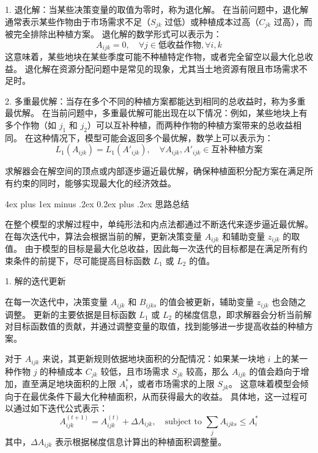 \documentclass[12pt,a4paper]{nmmcm}
\makeatletter
\renewcommand\subsubsection{\@startsection{subsubsection}{3}{1em}%
  {4ex plus 1ex minus .2ex}%
  {0.2ex plus .2ex}%
  {\normalfont\large\bfseries}}
\makeatother
\begin{document}
1. 退化解：当某些决策变量的取值为零时，称为退化解。
在当前问题中，退化解通常表示某些作物由于市场需求不足（$S_{jk}$ 过低）或种植成本过高（$C_{jk}$ 过高），而被完全排除出种植方案。
退化解的数学形式可以表示为：
\[
  A_{ijk} = 0, \quad \forall j \in \text{低收益作物}, \forall i, k
\]
这意味着，某些地块在某些季度可能不种植特定作物，或者完全留空以最大化总收益。
退化解在资源分配问题中是常见的现象，尤其当土地资源有限且市场需求不足时。


2. 多重最优解：当存在多个不同的种植方案都能达到相同的总收益时，称为多重最优解。
在当前问题中，多重最优解可能出现在以下情况：例如，某些地块上有多个作物（如 $j_1$ 和 $j_2$）可以互补种植，而两种作物的种植方案带来的总收益相同。
在这种情况下，模型可能会返回多个最优解，数学上可以表示为：
\[
  L_1(A_{ijk}) = L_1(A'_{ijk}), \quad \forall A_{ijk}, A'_{ijk} \in \text{互补种植方案}
\]

求解器会在解空间的顶点或内部逐步逼近最优解，确保种植面积分配方案在满足所有约束的同时，能够实现最大化的经济效益。


\subsubsection{思路总结}

在整个模型的求解过程中，单纯形法和内点法都通过不断迭代来逐步逼近最优解。
在每次迭代中，算法会根据当前的解，更新决策变量 $A_{ijk}$ 和辅助变量 $z_{ijk}$ 的取值。
由于模型的目标是最大化总收益，因此每一次迭代的目标都是在满足所有约束条件的前提下，尽可能提高目标函数 $L_1$ 或 $L_2$ 的值。


1. 解的迭代更新

在每一次迭代中，决策变量 $A_{ijk}$ 和 $B_{ijks}$ 的值会被更新，辅助变量 $z_{ijk}$ 也会随之调整。
更新的主要依据是目标函数 $L_1$ 或 $L_2$ 的梯度信息，即求解器会分析当前解对目标函数值的贡献，并通过调整变量的取值，找到能够进一步提高收益的种植方案。


对于 $A_{ijk}$ 来说，其更新规则依据地块面积的分配情况：如果某一块地 $i$ 上的某一种作物 $j$ 的种植成本 $C_{jk}$ 较低，且市场需求 $S_{jk}$ 较高，那么 $A_{ijk}$ 的值会趋向于增加，直至满足地块面积的上限 $A_i^*$，或者市场需求的上限 $S_{jk}$。
这意味着模型会倾向于在最优条件下最大化种植面积，从而获得最大的收益。
具体地，这一过程可以通过如下迭代公式表示：
\[
  A_{ijk}^{(t+1)} = A_{ijk}^{(t)} + \Delta A_{ijk}, \quad \text{subject to } \sum_j A_{ijks} \leq A_i^*
\]
其中，$\Delta A_{ijk}$ 表示根据梯度信息计算出的种植面积调整量。
\end{document}
